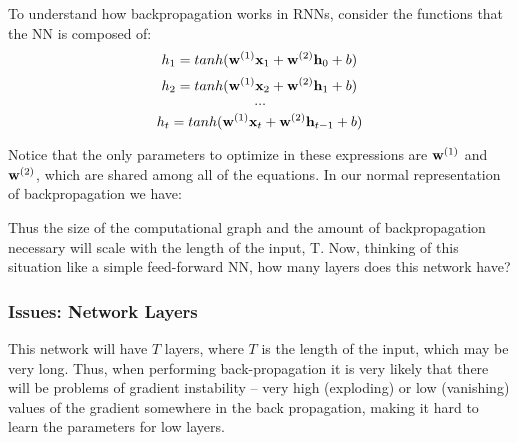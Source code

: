 \documentclass{article}
\begin{document}
To understand how backpropagation works in RNNs, consider the functions that the NN is composed of:
$$h_{1} = tanh(\bold{w}^{(1)}\bold{x}_{1} + \bold{w}^{(2)}\bold{h}_{0} + b)$$
$$h_{2} = tanh(\bold{w}^{(1)}\bold{x}_{2} + \bold{w}^{(2)}\bold{h}_{1} + b)$$
$$\dots$$
$$h_{t} = tanh(\bold{w}^{(1)}\bold{x}_{t} + \bold{w}^{(2)}\bold{h}_{t-1} + b)$$

Notice that the only parameters to optimize in these expressions are $\bold{w}^{(1)}$ and $\bold{w}^{(2)}$, which are shared among all of the equations. In our normal representation of backpropagation we have:


\begin{center}
\end{center}

Thus the size of the computational graph and the amount of backpropagation necessary will scale with the length of the input, T. Now, thinking of this situation like a simple feed-forward NN, how many layers does this network have?

\subsubsection{Issues: Network Layers}

This network will have $T$ layers, where $T$ is the length of the input, which may be very long. Thus, when performing back-propagation it is very likely that there will be problems of gradient instability -- very high (exploding) or low (vanishing) values of the gradient somewhere in the back propagation, making it hard to learn the parameters for low layers. 
\end{document}
